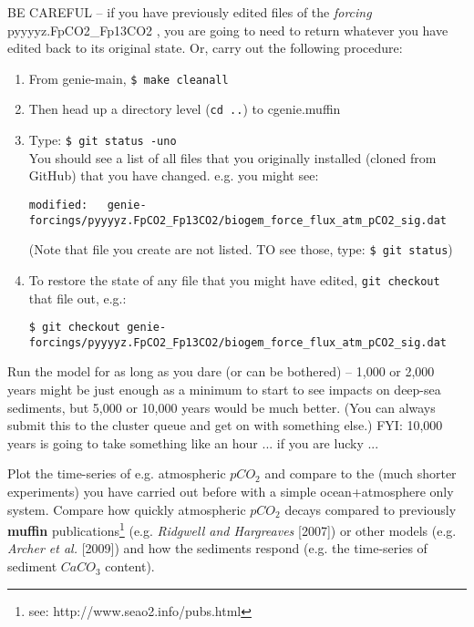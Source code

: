 \documentclass[11pt,fleqn]{book} %
\begin{document}
BE CAREFUL -- if you have previously edited files of the \textit{forcing} \textsf{\footnotesize  pyyyyz.FpCO2\_Fp13CO2 }, you are going to need to return whatever you have edited back to its original state. Or, carry out the following procedure:
\vspace{1mm}
\begin{enumerate}[noitemsep]
\item From \textsf{\footnotesize genie-main}, \texttt{\$ make cleanall}
\item Then head up a directory level (\texttt{cd ..}) to \textsf{\footnotesize cgenie.muffin}
\item Type: \texttt{\$ git status -uno}
\\You should see a list of all files that you originally installed (cloned from GitHub) that you have changed. e.g. you might see:
\vspace{-1mm}\small\begin{verbatim}
modified:   genie-forcings/pyyyyz.FpCO2_Fp13CO2/biogem_force_flux_atm_pCO2_sig.dat
\end{verbatim}\normalsize\vspace{-1mm}
(Note that file you create are not listed. TO see those, type: \texttt{\$ git status})
\item To restore the state of any file that you might have edited, \texttt{git checkout} that file out, e.g.:
\vspace{-1mm}\small\begin{verbatim}
$ git checkout genie-forcings/pyyyyz.FpCO2_Fp13CO2/biogem_force_flux_atm_pCO2_sig.dat
\end{verbatim}\normalsize\vspace{-1mm}
\end{enumerate}
\vspace{1mm}

Run the model for as long as you dare (or can be bothered) – 1,000 or 2,000 years might be just enough as a minimum to start to see impacts on deep-sea sediments, but 5,000 or 10,000 years would be much better. (You can always submit this to the cluster queue and get on with something else.) FYI: 10,000 years is going to take something like an hour ... if you are lucky ...

Plot the time-series of e.g. atmospheric \(pCO_{2}\) and compare to the (much shorter experiments) you have carried out before with a simple ocean+atmosphere only system. Compare how quickly atmospheric \(pCO_{2}\) decays compared to previously \textbf{muffin} publications\footnote{see: http://www.seao2.info/pubs.html} (e.g. \textit{Ridgwell and Hargreaves} [2007]) or other models (e.g. \textit{Archer et al.} [2009]) and  how the sediments respond (e.g. the time-series of sediment \(CaCO_{3}\) content). 
\end{document}
